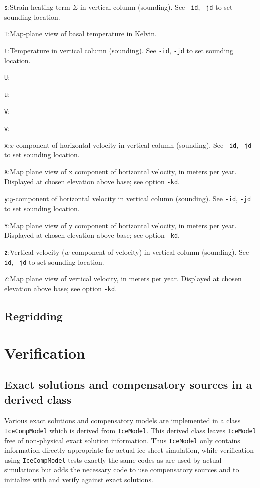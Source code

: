 \documentclass[11pt,final]{amsart}
\renewcommand{\t}[1]{\texttt{#1}}
\begin{document}
\verb|s|:\quad Strain heating term $\Sigma$ in vertical column (sounding).  See \verb|-id|, \verb|-jd| to set sounding location.

\verb|T|:\quad Map-plane view of basal temperature in Kelvin.

\verb|t|:\quad Temperature in vertical column (sounding).  See \verb|-id|, \verb|-jd| to set sounding location.

\verb|U|:\quad

\verb|u|:\quad

\verb|V|:\quad

\verb|v|:\quad

\verb|x|:\quad $x$-component of horizontal velocity in vertical column (sounding).  See \verb|-id|, \verb|-jd| to set sounding location.

\verb|X|:\quad Map plane view of x component of horizontal velocity, in meters per year.  Displayed at chosen elevation above base; see option \verb|-kd|.

\verb|y|:\quad $y$-component of horizontal velocity in vertical column (sounding).  See \verb|-id|, \verb|-jd| to set sounding location.

\verb|Y|:\quad Map plane view of y component of horizontal velocity, in meters per year.  Displayed at chosen elevation above base; see option \verb|-kd|.

\verb|z|:\quad Vertical velocity ($w$-component of velocity) in vertical column (sounding).  See \verb|-id|, \verb|-jd| to set sounding location.

\verb|Z|:\quad Map plane view of vertical velocity, in meters per year.  Displayed at chosen elevation above base; see option \verb|-kd|.


\subsection{Regridding}



\section{Verification}


\subsection{Exact solutions and compensatory sources in a derived class}  Various exact solutions and compensatory models are implemented in a class \t{IceCompModel} which is derived from \t{IceModel}.  This derived class leaves \t{IceModel} free of non-physical exact solution information.  Thus \t{IceModel} only contains information directly appropriate for actual ice sheet simulation, while verification using \t{IceCompModel} tests exactly the same codes as are used by actual simulations but adds the necessary code to use compensatory sources and to initialize with and verify against exact solutions.
\end{document}
